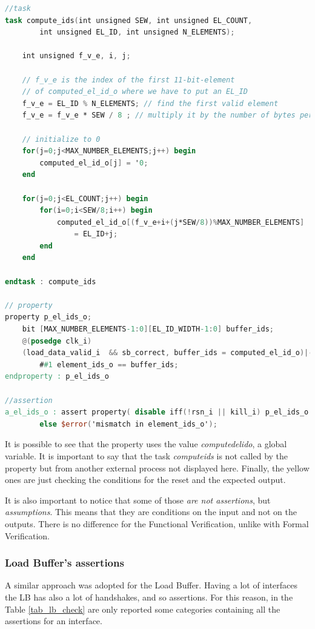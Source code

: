 \newpage
\linespread{1}
\begin{lstlisting}[language=Verilog,style=verilog-style, backgroundcolor=\color{lyel_palette}, frame=tlb]
//task
task compute_ids(int unsigned SEW, int unsigned EL_COUNT, 
	    int unsigned EL_ID, int unsigned N_ELEMENTS);

    int unsigned f_v_e, i, j;
		
    // f_v_e is the index of the first 11-bit-element 
    // of computed_el_id_o where we have to put an EL_ID
	f_v_e = EL_ID % N_ELEMENTS; // find the first valid element 
	f_v_e = f_v_e * SEW / 8 ; // multiply it by the number of bytes per el
		
	// initialize to 0
	for(j=0;j<MAX_NUMBER_ELEMENTS;j++) begin
	    computed_el_id_o[j] = '0;
	end

	for(j=0;j<EL_COUNT;j++) begin
		for(i=0;i<SEW/8;i++) begin
			computed_el_id_o[(f_v_e+i+(j*SEW/8))%MAX_NUMBER_ELEMENTS] 
			    = EL_ID+j;
		end
	end

endtask : compute_ids

// property
property p_el_ids_o;
	bit [MAX_NUMBER_ELEMENTS-1:0][EL_ID_WIDTH-1:0] buffer_ids;
	@(posedge clk_i)
	(load_data_valid_i  && sb_correct, buffer_ids = computed_el_id_o)|-> 
        ##1 element_ids_o == buffer_ids;
endproperty : p_el_ids_o

//assertion
a_el_ids_o : assert property( disable iff(!rsn_i || kill_i) p_el_ids_o ) 
        else $error('mismatch in element_ids_o');
\end{lstlisting}
\linespread{1.2}
\bigskip

It is possible to see that the property uses the value \emph{computed\+el\+id\+o}, a global variable. It is important to say that the task \emph{compute\+ids} is not called by the property but from another external process not displayed here.
Finally, the yellow ones are just checking the conditions for the reset and the expected output.

It is also important to notice that some of those \emph{are not assertions}, but \emph{assumptions}. This means that they are conditions on the input and not on the outputs. There is no difference for the Functional Verification, unlike with Formal Verification.



\subsubsection{Load Buffer's assertions}
A similar approach was adopted for the Load Buffer. Having a lot of interfaces the LB has also a lot of handshakes, and so assertions. For this reason, in the Table \ref{tab_lb_check} are only reported some categories containing all the assertions for an interface.


